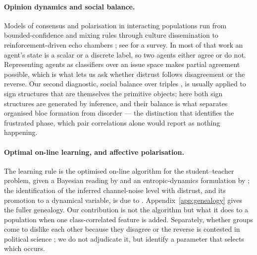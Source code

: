 \paragraph{Opinion dynamics and social balance.} Models of consensus and
polarisation in interacting populations run from bounded-confidence and mixing
rules \citep{deffuant2000mixing,hegselmann2002opinion} through culture
dissemination \citep{axelrod1997dissemination} to reinforcement-driven echo
chambers \citep{baumann2020modeling}; see \citet{castellano2009statistical} for a
survey. In most of that work an agent's state is a scalar or a discrete label, so
two agents either agree or do not. Representing agents as classifiers over an
issue space \citep{caticha2011agent} makes partial agreement possible, which is
what lets us ask whether distrust follows disagreement or the reverse. Our second
diagnostic, social balance over triples
\citep{heider1946attitudes,cartwright1956structural,antal2005dynamics,marvel2011continuous},
is usually applied to sign structures that are themselves the primitive objects;
here both sign structures are generated by inference, and their balance is what
separates organised bloc formation from disorder --- the distinction that
identifies the frustrated phase, which pair correlations alone would report as
nothing happening.

\paragraph{Optimal on-line learning, and affective polarisation.} The learning rule
is the optimised on-line algorithm for the student--teacher problem, given a Bayesian
reading by \citet{opper1996online} and an entropic-dynamics formulation by
\citet{caticha2020entropic}; the identification of the inferred channel-noise level
with distrust, and its promotion to a dynamical variable, is due to
\citet{alves2016distrust}. Appendix~\ref{app:genealogy} gives the fuller genealogy.
Our contribution is not the algorithm but what it does to a population when one
class-correlated feature is added. Separately, whether groups come to dislike each
other because they disagree or the reverse is contested in political science
\citep{fiorina2008polarization,iyengar2012affect,iyengar2015fear}; we do not
adjudicate it, but identify a parameter that selects which occurs.
